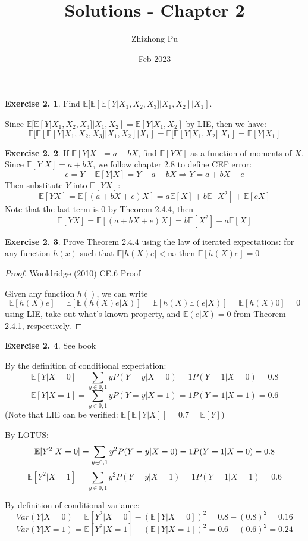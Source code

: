 \documentclass[12pt,letterpaper,reqno]{amsart}
\newcommand{\E}{\mathbb E}
\theoremstyle{plain}
\theoremstyle{definition}
\theoremstyle{definition}
\newtheorem{Exercise}{Exercise 2.}
\numberwithin{equation}{section}
\begin{document}
\author{Zhizhong Pu}
\title{Solutions - Chapter 2}
\date{Feb 2023}
\maketitle

\thispagestyle{empty}

\begin{Exercise} Find $\E[\E[\E[Y|X_1,X_2,X_3]|X_1,X_2]|X_1]$.

    Since $\E[\E[Y|X_1,X_2,X_3]|X_1,X_2]=\E[Y|X_1,X_2]$ by LIE, then we have:
    \[
    \E[\E[\E[Y|X_1,X_2,X_3]|X_1,X_2]|X_1] = \E[\E[Y|X_1,X_2]|X_1] = \E[Y|X_1]
    \]
    
\end{Exercise}

\begin{Exercise} If $\E[Y|X]=a+bX$, find $\E[YX]$ as a function of moments of $X$.
    Since $\E[Y|X]=a+bX$, we follow chapter 2.8 to define CEF error:
    \[
    e=Y-\E[Y|X]=Y-a+bX\Rightarrow Y=a+bX+e
    \]
    Then substitute $Y$ into $\E[YX]$:
    \[
    \E[YX]=\E[(a+bX+e)X]=a\E[X]+b\E[X^2]+\E[eX]
    \]
    Note that the last term is $0$ by Theorem 2.4.4, then
    \[
     \E[YX]=\E[(a+bX+e)X]=b\E[X^2]+a\E[X]
    \]

\end{Exercise}

\begin{Exercise}
Prove Theorem 2.4.4 using the law of iterated expectations: for any function $h(x)$ such that $\E|h(X)e|<\infty$ then $\E[h(X)e]=0$
    \begin{proof} Wooldridge (2010) CE.6 Proof

    Given any function $h()$, we can write
    \[
    \E[h(X)e]=\E[\E(h(X)e|X)]=\E[h(X)\E(e|X)]=\E[h(X)0]=0
    \]
    using LIE, take-out-what's-known property, and $\E(e|X)=0$ from Theorem 2.4.1, respectively.
    \end{proof}
\end{Exercise}

\begin{Exercise} See book

By the definition of conditional expectation:
\[
    \E[Y|X=0]=\sum_{y\in{0,1}}yP(Y=y|X=0)=1P(Y=1|X=0)=0.8 
\]
\[
    \E[Y|X=1]=\sum_{y\in{0,1}}yP(Y=y|X=1)=1P(Y=1|X=1)=0.6
\]
(Note that LIE can be verified: $\E[\E[Y|X]]=0.7=\E[Y]$)

By LOTUS:
\[
    \E[Y^2|X=0]=\sum_{y\in{0,1}}y^2P(Y=y|X=0)=1P(Y=1|X=0)=0.8 \\
\]
\[
    \E[Y^2|X=1]=\sum_{y\in{0,1}}y^2P(Y=y|X=1)=1P(Y=1|X=1)=0.6
\]

By definition of conditional variance:
\[
    Var(Y|X=0)=\E[Y^2|X=0]-(\E[Y|X=0])^2=0.8-(0.8)^2=0.16
\]
\[
    Var(Y|X=1)=\E[Y^2|X=1]-(\E[Y|X=1])^2=0.6-(0.6)^2=0.24
\]
\end{Exercise}
\end{document}
